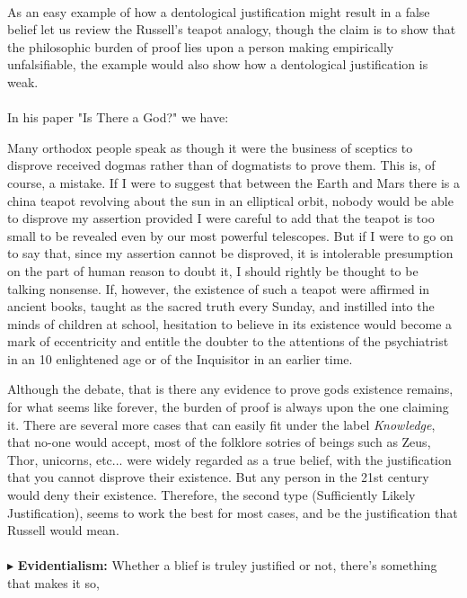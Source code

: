 \documentclass[9pt,a4paper,twocolumn]{article}
\newcommand{\newpoint}[1]{\indent$\blacktriangleright$ \textbf{#1}}
\begin{document}
                \\
                As an easy example of how a dentological justification might result in a false belief let us review the Russell's teapot analogy, though the claim is to show that the philosophic burden of proof lies upon a person making empirically unfalsifiable, the example would also show how a dentological justification is weak. \cite{enwiki:1149010951}
                \\
                \\
                In his paper "Is There a God?" we have:
                \begin{qt}
                    Many orthodox people speak as though it were the business of sceptics to disprove received dogmas rather than of dogmatists to prove them. This is, of course, a mistake. If I were to suggest that between the Earth and Mars there is a china teapot revolving about the sun in an elliptical orbit, nobody would be able to disprove my assertion provided I were careful to add that the teapot is too small to be revealed even by our most powerful telescopes. But if I were to go on to say that, since my assertion cannot be disproved, it is intolerable presumption on the part of human reason to doubt it, I should rightly be thought to be talking nonsense. If, however, the existence of such a teapot were affirmed in ancient books, taught as the sacred truth every Sunday, and instilled into the minds of children at school, hesitation to believe in its existence would become a mark of eccentricity and entitle the doubter to the attentions of the psychiatrist in an 10 enlightened age or of the Inquisitor in an earlier time.
                \end{qt}
                Although the debate, that is there any evidence to prove gods existence remains, for what seems like forever, the burden of proof is always upon the one claiming it. There are several more cases that can easily fit under the label \textit{Knowledge}, that no-one would accept, most of the folklore sotries of beings such as Zeus, Thor, unicorns, etc... were widely regarded as a true belief, with the justification that you cannot disprove their existence. But any person in the 21st century would deny their existence. Therefore, the second type (Sufficiently Likely Justification), seems to work the best for most cases, and be the justification that Russell would mean.\cite{Russell1952}
                \\
                \\
                \newpoint{Evidentialism:} Whether a blief is truley justified or not, there's something that makes it so,


        
        
        
        
        
        
        
        
        
        
        
        \newpage
        
        
\end{document}
